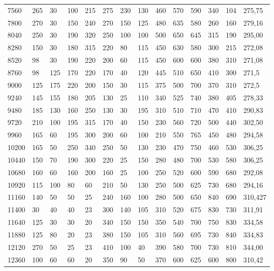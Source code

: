\begin{table}
\begin{sideways}
\begin{tabular}{|l|l|l|l|l|l|l|l|l|l|l|l|l|l|}
7560 & 265 & 30 & 100 & 215 & 275 & 230 & 130 & 460 & 570 & 590 & 340 & 104 & 275,75\\
7800 & 270 & 30 & 150 & 240 & 270 & 150 & 125 & 480 & 635 & 580 & 260 & 160 & 279,16\\
8040 & 250 & 30 & 190 & 320 & 250 & 100 & 100 & 500 & 650 & 645 & 315 & 190 & 295,00\\
8280 & 150 & 30 & 180 & 315 & 220 & 80 & 115 & 450 & 630 & 580 & 300 & 215 & 272,08\\
8520 & 98 & 30 & 190 & 220 & 200 & 60 & 115 & 450 & 600 & 600 & 380 & 310 & 271,08\\
8760 & 98 & 125 & 170 & 220 & 170 & 40 & 120 & 445 & 510 & 650 & 410 & 300 & 271,5\\
9000 & 125 & 175 & 220 & 200 & 150 & 30 & 115 & 375 & 500 & 700 & 370 & 310 & 272,5\\
9240 & 145 & 155 & 180 & 205 & 130 & 25 & 110 & 340 & 525 & 740 & 380 & 405 & 278,33\\
9480 & 185 & 130 & 160 & 250 & 130 & 30 & 195 & 310 & 510 & 710 & 470 & 410 & 290,83\\
9720 & 210 & 100 & 195 & 315 & 170 & 40 & 150 & 230 & 560 & 720 & 500 & 440 & 302,50\\
9960 & 165 & 60 & 195 & 300 & 200 & 60 & 100 & 210 & 550 & 765 & 450 & 480 & 294,58\\
10200 & 165 & 50 & 250 & 340 & 250 & 50 & 130 & 230 & 470 & 750 & 460 & 530 & 306,25\\
10440 & 150 & 70 & 190 & 300 & 220 & 25 & 150 & 280 & 480 & 700 & 530 & 580 & 306,25\\
10680 & 160 & 60 & 160 & 200 & 160 & 25 & 100 & 250 & 520 & 600 & 590 & 680 & 292,08\\
10920 & 115 & 100 & 80 & 60 & 210 & 50 & 130 & 250 & 500 & 625 & 730 & 680 & 294,16\\
11160 & 140 & 50 & 50 & 25 & 240 & 160 & 100 & 280 & 500 & 650 & 840 & 690 & 310,427\\
11400 & 30 & 40 & 40 & 23 & 300 & 140 & 105 & 310 & 520 & 675 & 830 & 730 & 311,91\\
11640 & 125 & 30 & 30 & 20 & 340 & 150 & 150 & 350 & 540 & 700 & 750 & 830 & 334,58\\
11880 & 125 & 80 & 20 & 23 & 380 & 150 & 105 & 310 & 560 & 695 & 730 & 840 & 334,83\\
12120 & 270 & 50 & 25 & 23 & 410 & 100 & 40 & 390 & 580 & 700 & 730 & 810 & 344,00\\
12360 & 100 & 60 & 60 & 20 & 350 & 90 & 50 & 370 & 600 & 625 & 600 & 800 & 310,42\\

\end{tabular}
\end{sideways}
\end{table}
